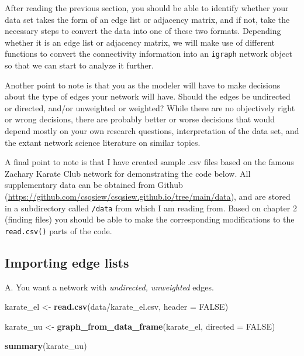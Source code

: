 \documentclass[
]{book}
\newenvironment{Shaded}{\begin{snugshade}}{\end{snugshade}}
\newcommand{\AttributeTok}[1]{\textcolor[rgb]{0.13,0.29,0.53}{#1}}
\newcommand{\ConstantTok}[1]{\textcolor[rgb]{0.56,0.35,0.01}{#1}}
\newcommand{\FunctionTok}[1]{\textcolor[rgb]{0.13,0.29,0.53}{\textbf{#1}}}
\newcommand{\NormalTok}[1]{#1}
\newcommand{\OtherTok}[1]{\textcolor[rgb]{0.56,0.35,0.01}{#1}}
\newcommand{\StringTok}[1]{\textcolor[rgb]{0.31,0.60,0.02}{#1}}
\begin{document}
After reading the previous section, you should be able to identify whether your data set takes the form of an edge list or adjacency matrix, and if not, take the necessary steps to convert the data into one of these two formats. Depending whether it is an edge list or adjacency matrix, we will make use of different functions to convert the connectivity information into an \texttt{igraph} network object so that we can start to analyze it further.

Another point to note is that you as the modeler will have to make decisions about the type of edges your network will have. Should the edges be undirected or directed, and/or unweighted or weighted? While there are no objectively right or wrong decisions, there are probably better or worse decisions that would depend mostly on your own research questions, interpretation of the data set, and the extant network science literature on similar topics.

A final point to note is that I have created sample .csv files based on the famous Zachary Karate Club network for demonstrating the code below. All supplementary data can be obtained from Github (\url{https://github.com/csqsiew/csqsiew.github.io/tree/main/data}), and are stored in a subdirectory called \texttt{/data} from which I am reading from. Based on chapter 2 (finding files) you should be able to make the corresponding modifications to the \texttt{read.csv()} parts of the code.

\subsection{Importing edge lists}\label{importing-edge-lists}

A. You want a network with \emph{undirected, unweighted} edges.

\begin{Shaded}
\begin{Highlighting}[]
\NormalTok{karate\_el }\OtherTok{\textless{}{-}} \FunctionTok{read.csv}\NormalTok{(}\StringTok{\textquotesingle{}data/karate\_el.csv\textquotesingle{}}\NormalTok{, }\AttributeTok{header =} \ConstantTok{FALSE}\NormalTok{)}

\NormalTok{karate\_uu }\OtherTok{\textless{}{-}} \FunctionTok{graph\_from\_data\_frame}\NormalTok{(karate\_el, }\AttributeTok{directed =} \ConstantTok{FALSE}\NormalTok{)}

\FunctionTok{summary}\NormalTok{(karate\_uu)}
\end{Highlighting}
\end{Shaded}
\end{document}
